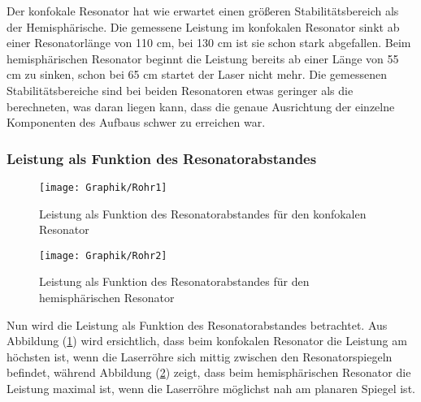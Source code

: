 \documentclass[10pt,twoside]{article}
\renewcommand{\1}{^{-1}}
\renewcommand{\2}{^{-2}}
\newcommand{\3}{^{-3}}
\newcommand{\4}{^{-4}}
\newcommand{\5}{^{-5}}
\newcommand{\6}{^{-6}}
\newcommand{\7}{^{-7}}
\newcommand{\8}{^{-8}}
\newcommand{\9}{^{-9}}
\begin{document}
Der konfokale Resonator hat wie erwartet einen größeren Stabilitätsbereich als der Hemisphärische.
Die gemessene Leistung im konfokalen Resonator sinkt ab einer Resonatorlänge von 110 cm, bei 130 cm ist sie schon stark abgefallen.
Beim hemisphärischen Resonator beginnt die Leistung bereits ab einer Länge von 55 cm zu sinken, schon bei 65 cm startet der Laser nicht mehr.
Die gemessenen Stabilitätsbereiche sind bei beiden Resonatoren etwas geringer als die berechneten, was daran liegen kann, dass die genaue Ausrichtung der einzelne Komponenten des Aufbaus schwer zu erreichen war.

\newpage

\subsubsection{Leistung als Funktion des Resonatorabstandes}

\begin{figure}[H]
\centering
\texttt{[image: Graphik/Rohr1]} 
\caption{Leistung als Funktion des Resonatorabstandes für den konfokalen Resonator}
\label{fig:Rohr1}
\end{figure}

\begin{figure}[H]
\centering
\texttt{[image: Graphik/Rohr2]} 
\caption{Leistung als Funktion des Resonatorabstandes für den hemisphärischen Resonator}
\label{fig:Rohr2}
\end{figure}


Nun wird die Leistung als Funktion des Resonatorabstandes betrachtet. Aus Abbildung (\ref{fig:Rohr1}) wird ersichtlich, dass beim konfokalen Resonator die Leistung am höchsten ist, wenn die Laserröhre sich mittig zwischen den Resonatorspiegeln befindet, während Abbildung (\ref{fig:Rohr2}) zeigt, dass beim hemisphärischen Resonator die Leistung maximal ist, wenn die Laserröhre möglichst nah am planaren Spiegel ist.
\end{document}

